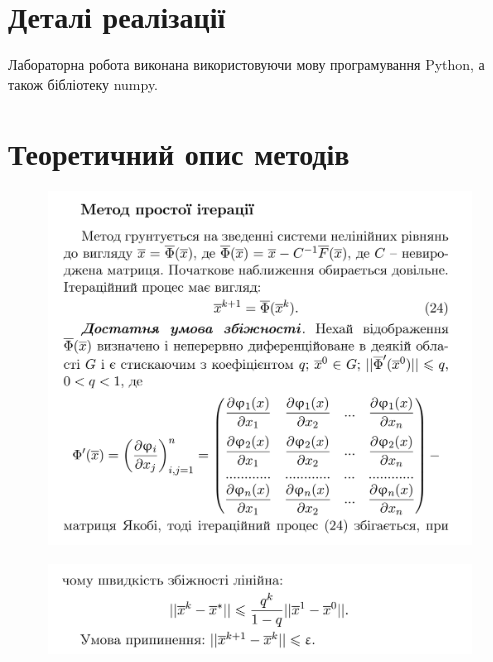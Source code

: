 \documentclass[a4paper, 12pt]{article}
\begin{document}
\section{Деталі реалізації}

Лабораторна робота виконана використовуючи мову програмування Python, а також бібліотеку numpy.

\clearpage
\section{Теоретичний опис методів}

\begin{figure}[ht]
	\centering
	\includegraphics[width=0.9\linewidth]{iteration1.png}
\end{figure}
\begin{figure}[ht]
	\centering
	\includegraphics[width=0.9\linewidth]{iteration2.png}
\end{figure}

\clearpage
\newpage
\end{document}

